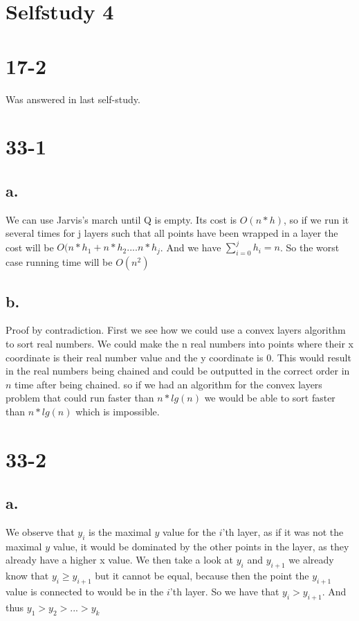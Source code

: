 \documentclass[12pt,a4paper]{report}
\begin{document}
\section*{Selfstudy 4}
\section*{17-2}
Was answered in last self-study.

\section*{33-1}
\subsection*{a.}
We can use Jarvis's march until Q is empty.  Its cost is $O(n*h)$, so if we run it several times for j layers such that all points have been wrapped in a layer the cost will be $O(n*h_1 + n*h_2 .... n*h_j$. And we have $\sum\limits_{i=0}^j{h_i} = n$. So the worst case running time will be $O(n^2)$

\subsection*{b.}
Proof by contradiction.
First we see how we could use a convex layers algorithm to sort real numbers.
We could make the n real numbers into points where their x coordinate is their real number value and the y coordinate is 0.
This would result in the real numbers being chained and could be outputted in the correct order in $n$ time after being chained.
so if we had an algorithm for the convex layers problem that could run faster than $n*lg(n)$ we would  be able to sort faster than $n*lg(n)$ which is impossible.

\section*{33-2}
\subsection*{a.}
We observe that $y_i$ is the maximal $y$ value for the $i$'th layer, as if it was not the maximal $y$ value, it would be dominated by the other points in the layer, as they already have a higher x value.
We then take a look at $y_i$ and $y_{i+1}$ we already know that $y_i \geq y_{i+1}$ but it cannot be equal, because then the point the $y_{i+1}$ value is connected to would be in the $i$'th layer. So we have that $y_{i} > y_{i+1}$.
And thus $y_1 > y_2 > ... > y_k$
\end{document}
